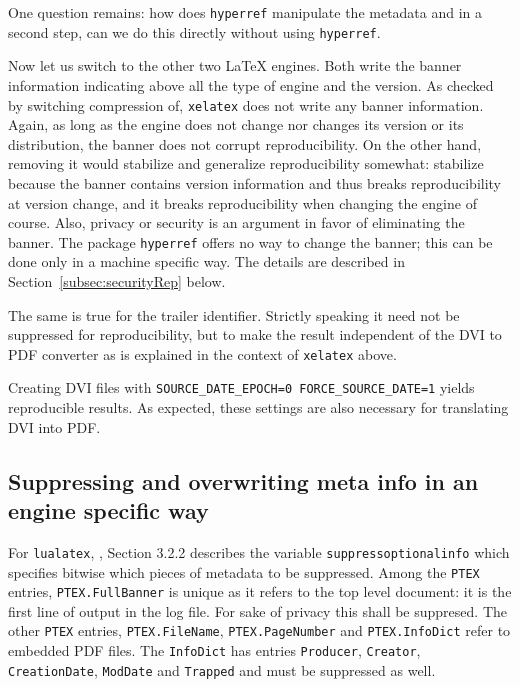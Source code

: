 \documentclass[a4paper]{article}%
\newcommand{\lualatex}{\texttt{lualatex}}
\newcommand{\xelatex}{\texttt{xelatex}}
\begin{document}
One question remains: how does \texttt{hyperref} manipulate the metadata 
and in a second step, can we do this directly without using \texttt{hyperref}. 
\medskip


Now let us switch to the other two \LaTeX{} engines. 
Both write the banner information indicating 
above all the type of engine and the version. 
As checked by switching compression of, \xelatex{} does not write any banner information. 
Again, as long as the engine does not change nor changes its version or its distribution, 
the banner does not corrupt reproducibility. 
On the other hand, removing it would stabilize and generalize reproducibility somewhat: 
stabilize because the banner contains version information 
and thus breaks reproducibility at version change, 
and it breaks reproducibility when changing the engine of course. 
Also, privacy or security is an argument in favor of eliminating the banner. 
The package \texttt{hyperref} offers no way to change the banner; 
this can be done only in a machine specific way. 
The details are described in Section~\ref{subsec:securityRep} below. 

The same is true for the trailer identifier. 
Strictly speaking it need not be suppressed for reproducibility, 
but to make the result independent of the DVI to PDF converter 
as is explained in the context of \xelatex{} above. 

Creating DVI files with \texttt{SOURCE\_DATE\_EPOCH=0 FORCE\_SOURCE\_DATE=1} 
yields reproducible results. 
As expected, these settings are also necessary for translating DVI into PDF\@. 

\subsection{Suppressing and overwriting meta info in an engine specific way }

For \lualatex{}, 
\cite{LuaTexRef25}, Section 3.2.2 describes the variable \texttt{suppressoptionalinfo} 
which specifies bitwise which pieces of metadata to be suppressed. 
Among the \texttt{PTEX} entries, \texttt{PTEX.FullBanner} is unique as it refers to the top level document: 
it is the first line of output in the log file. 
For sake of privacy this shall be suppresed. 
The other \texttt{PTEX} entries, 
\texttt{PTEX.FileName}, \texttt{PTEX.PageNumber} and \texttt{PTEX.InfoDict} 
refer to embedded PDF files. 
The \texttt{InfoDict} has entries 
\texttt{Producer}, \texttt{Creator}, \texttt{CreationDate}, \texttt{ModDate} 
and \texttt{Trapped} and must be suppressed as well. 
\end{document}
